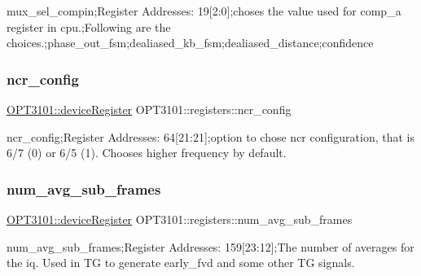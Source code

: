 mux\+\_\+sel\+\_\+compin;Register Addresses\+: 19\mbox{[}2\+:0\mbox{]};choses the value used for comp\+\_\+a register in cpu.;Following are the choices.;phase\+\_\+out\+\_\+fsm;dealiased\+\_\+kb\+\_\+fsm;dealiased\+\_\+distance;confidence 

\mbox{\label{class_o_p_t3101_1_1registers_a6a2fb5089cb59657163752ab2bc8fd0c}} 
\subsubsection{\texorpdfstring{ncr\+\_\+config}{ncr\_config}}
{\footnotesize\ttfamily \mbox{\hyperlink{class_o_p_t3101_1_1device_register}{O\+P\+T3101\+::device\+Register}} O\+P\+T3101\+::registers\+::ncr\+\_\+config}



ncr\+\_\+config;Register Addresses\+: 64\mbox{[}21\+:21\mbox{]};option to chose ncr configuration, that is 6/7 (0) or 6/5 (1). Chooses higher frequency by default. 

\mbox{\label{class_o_p_t3101_1_1registers_a9b89956eebb5258cbb968ba07182c98c}} 
\subsubsection{\texorpdfstring{num\+\_\+avg\+\_\+sub\+\_\+frames}{num\_avg\_sub\_frames}}
{\footnotesize\ttfamily \mbox{\hyperlink{class_o_p_t3101_1_1device_register}{O\+P\+T3101\+::device\+Register}} O\+P\+T3101\+::registers\+::num\+\_\+avg\+\_\+sub\+\_\+frames}



num\+\_\+avg\+\_\+sub\+\_\+frames;Register Addresses\+: 159\mbox{[}23\+:12\mbox{]};The number of averages for the iq. Used in TG to generate early\+\_\+fvd and some other TG signals. 

\mbox{\label{class_o_p_t3101_1_1registers_a580fcd93b67fc370744aa6f366a0cf27}} 
